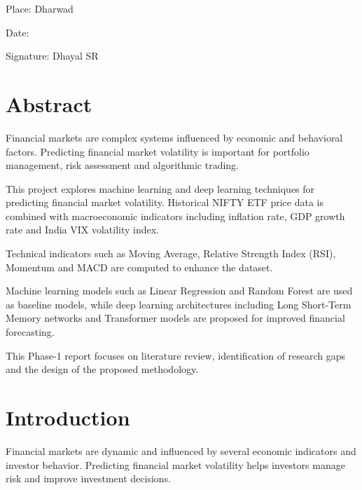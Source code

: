 \documentclass[12pt]{article}
\begin{document}
\vspace{2cm}

Place: Dharwad

Date:

\vspace{1cm}

Signature: Dhayal SR


\newpage
\section*{Abstract}

Financial markets are complex systems influenced by economic and behavioral factors. Predicting financial market volatility is important for portfolio management, risk assessment and algorithmic trading.

This project explores machine learning and deep learning techniques for predicting financial market volatility. Historical NIFTY ETF price data is combined with macroeconomic indicators including inflation rate, GDP growth rate and India VIX volatility index.

Technical indicators such as Moving Average, Relative Strength Index (RSI), Momentum and MACD are computed to enhance the dataset.

Machine learning models such as Linear Regression and Random Forest are used as baseline models, while deep learning architectures including Long Short-Term Memory networks and Transformer models are proposed for improved financial forecasting.

This Phase-1 report focuses on literature review, identification of research gaps and the design of the proposed methodology.


\newpage
\tableofcontents


\newpage
\section{Introduction}

Financial markets are dynamic and influenced by several economic indicators and investor behavior. Predicting financial market volatility helps investors manage risk and improve investment decisions.
\end{document}
